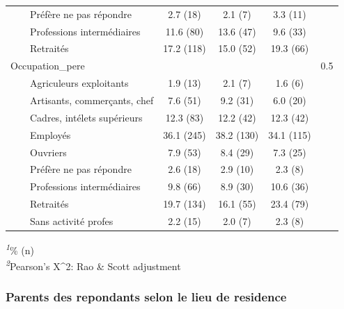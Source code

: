 \documentclass[
]{article}
\begin{document}
\begin{table}[!t]
\begin{tabular*}{\linewidth}{@{\extracolsep{\fill}}lcccc}
    Préfère ne pas répondre & 2.7 (18) & 2.1 (7) & 3.3 (11) &  \\ 
    Professions intermédiaires & 11.6 (80) & 13.6 (47) & 9.6 (33) &  \\ 
    Retraités & 17.2 (118) & 15.0 (52) & 19.3 (66) &  \\ 
Occupation\_pere &  &  &  & 0.5 \\ 
    Agriculeurs exploitants & 1.9 (13) & 2.1 (7) & 1.6 (6) &  \\ 
    Artisants, commerçants, chef & 7.6 (51) & 9.2 (31) & 6.0 (20) &  \\ 
    Cadres, intélets supérieurs & 12.3 (83) & 12.2 (42) & 12.3 (42) &  \\ 
    Employés & 36.1 (245) & 38.2 (130) & 34.1 (115) &  \\ 
    Ouvriers & 7.9 (53) & 8.4 (29) & 7.3 (25) &  \\ 
    Préfère ne pas répondre & 2.6 (18) & 2.9 (10) & 2.3 (8) &  \\ 
    Professions intermédiaires & 9.8 (66) & 8.9 (30) & 10.6 (36) &  \\ 
    Retraités & 19.7 (134) & 16.1 (55) & 23.4 (79) &  \\ 
    Sans activité profes & 2.2 (15) & 2.0 (7) & 2.3 (8) &  \\ 
\bottomrule
\end{tabular*}
\begin{minipage}{\linewidth}
\textsuperscript{\textit{1}}\% (n)\\
\textsuperscript{\textit{2}}Pearson's X\^{}2: Rao \& Scott adjustment\\
\end{minipage}
\end{table}
\vspace{1cm}

\hypertarget{parents-des-repondants-selon-le-lieu-de-residence}{%
\subsubsection{Parents des repondants selon le lieu de
residence}\label{parents-des-repondants-selon-le-lieu-de-residence}}
\end{document}
